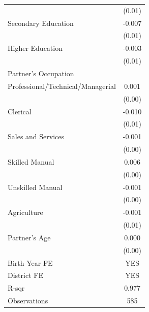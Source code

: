 \begin{longtable}{l*{1}{c}}
                    & (0.01) \\
\hspace{1em}Secondary Education & -0.007 \\
                    & (0.01) \\
\hspace{1em}Higher Education & -0.003 \\
                    & (0.01) \\
\multicolumn{2}{l}{Partner's Occupation} \\
\hspace{1em}Professional/Technical/Managerial & 0.001 \\
                    & (0.00) \\
\hspace{1em}Clerical & -0.010\sym{*} \\
                    & (0.01) \\
\hspace{1em}Sales and Services & -0.001 \\
                    & (0.00) \\
\hspace{1em}Skilled Manual & 0.006 \\
                    & (0.00) \\
\hspace{1em}Unskilled Manual & -0.001 \\
                    & (0.00) \\
\hspace{1em}Agriculture & -0.001 \\
                    & (0.01) \\
Partner's Age & 0.000 \\
                    & (0.00) \\
\hline
Birth Year FE & YES \\
District FE & YES \\
R-sqr & 0.977 \\
Observations & 585 \\
\hline \hline

\end{longtable}